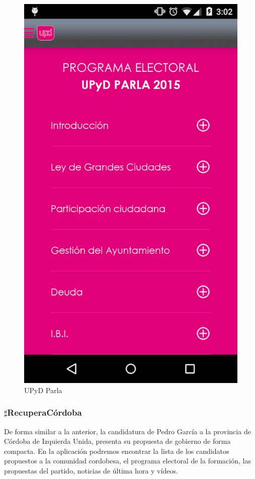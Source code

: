 \begin{figure}[H]
\centering
\includegraphics[keepaspectratio, scale=0.35]{Media/Captures/UPyDParla.png}
\caption{UPyD Parla}
\label{fig:upydparla}
\end{figure}

\subsubsection{$\sharp$RecuperaCórdoba}
De forma similar a la anterior, la candidatura de Pedro García a la provincia de Córdoba de Izquierda Unida, presenta su propuesta de gobierno de forma compacta. En la aplicación podremos encontrar la lista de los candidatos propuestos a la comunidad cordobesa, el programa electoral de la formación, las propuestas del partido, noticias de última hora y vídeos.

